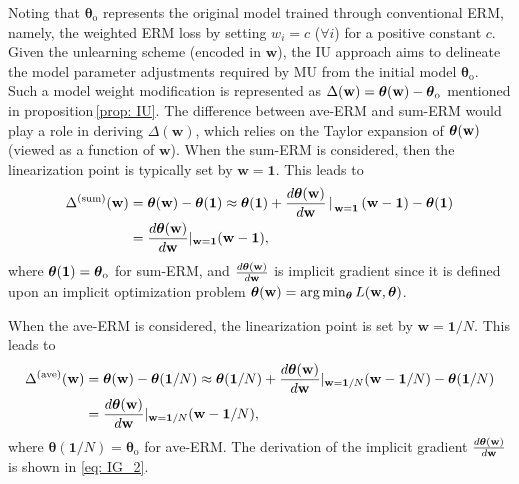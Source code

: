 Noting that $\boldsymbol \theta_{\mathrm{o}}$ represents the original model trained through conventional ERM, namely, the weighted ERM loss by setting $w_i = c$ ($\forall i$) for a positive constant $c$.
Given the unlearning scheme (encoded in $\mathbf w$), the IU approach aims to delineate the model parameter adjustments required by MU from the initial model $\boldsymbol \theta_{\mathrm{o}}$. Such a model weight  modification is represented as $\Delta(\mathbf{w}) = \boldsymbol{\theta}(\mathbf w) - \boldsymbol{\theta}_{\mathrm{o}}$ mentioned in proposition\,\eqref{prop: IU}. The difference between ave-ERM and sum-ERM would play a role in  deriving $\Delta(\mathbf{w})$, which relies on the  {Taylor expansion} of $\boldsymbol{\theta} (\mathbf w)$ (viewed as a function of $\mathbf w$).
When the sum-ERM is considered, then the linearization point is typically set by $\mathbf w = \mathbf 1$. This leads to 
\begin{align}
  \Delta^{\mathrm{(sum)}}(\mathbf{w})&={\boldsymbol{\theta}}(\mathbf w) - {\boldsymbol{\theta}}(\mathbf 1)   \approx {\boldsymbol{\theta}}(\mathbf 1)+\frac{d\boldsymbol{\theta}(\mathbf w)}{d\mathbf w} \left | \right._{\mathbf w= \mathbf 1}  (\mathbf w-\mathbf 1) - {\boldsymbol{\theta}}(\mathbf 1) \nonumber \\
 & = \frac{d\boldsymbol{\theta}(\mathbf w)}{d\mathbf w}|_{\mathbf w= \mathbf 1} (\mathbf w-\mathbf 1),
 \label{eq: sum_erm}
\end{align}
where  $ \boldsymbol{\theta}(\mathbf 1) = \boldsymbol{\theta}_{\mathrm{o}}$  for sum-ERM, and
$\frac{d\boldsymbol{\theta}(\mathbf w)}{d\mathbf w}$ is  implicit gradient \cite{gould2016differentiating} since it is defined upon an implicit optimization problem ${\boldsymbol{\theta}}(\mathbf w) = \arg\min_{\boldsymbol{\theta}} L(\mathbf w, \boldsymbol{\theta})$.


When the ave-ERM is considered, the linearization point is set by $\mathbf w = \mathbf 1/N$. This leads to 
\begin{align}
  \Delta^{\mathrm{(ave)}}(\mathbf{w})&={\boldsymbol{\theta}}(\mathbf w) - {\boldsymbol{\theta}}(\mathbf 1/N)   \approx {\boldsymbol{\theta}}(\mathbf 1/N)+\frac{d\boldsymbol{\theta}(\mathbf w)}{d\mathbf w} |_{\mathbf w= \mathbf 1/N}  (\mathbf w-\mathbf 1/N) - {\boldsymbol{\theta}}(\mathbf 1/N) \nonumber \\
 & = \frac{d\boldsymbol{\theta}(\mathbf w)}{d\mathbf w}|_{\mathbf w= \mathbf 1/N} (\mathbf w-\mathbf 1/N),
 \label{eq: ave_erm}
\end{align}
where   $   \boldsymbol{\theta}(\mathbf 1/N) = \boldsymbol \theta_{\mathrm{o}}$ for ave-ERM. The derivation of the implicit gradient $\frac{d\boldsymbol{\theta}(\mathbf w)}{d\mathbf w}$ is shown in \eqref{eq: IG_2}.

